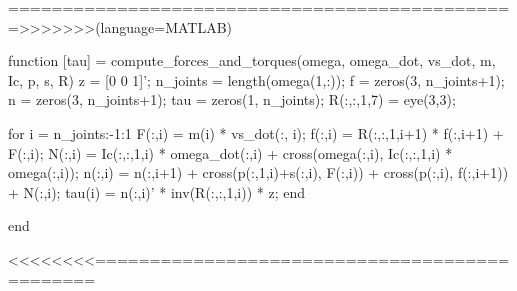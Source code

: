 ===============================================>>>>>>>(language=MATLAB)

function [tau] = compute_forces_and_torques(omega, omega_dot, vs_dot, m, Ic, p, s, R)
	z = [0 0 1]';
	n_joints = length(omega(1,:));
	f = zeros(3, n_joints+1);
	n = zeros(3, n_joints+1);
	tau = zeros(1, n_joints);
	R(:,:,1,7) = eye(3,3);

	for i = n_joints:-1:1
		F(:,i) = m(i) * vs_dot(:, i);
		f(:,i) = R(:,:,1,i+1) * f(:,i+1) + F(:,i);
		N(:,i) = Ic(:,:,1,i) * omega_dot(:,i) + cross(omega(:,i), Ic(:,:,1,i) * omega(:,i));
		n(:,i) = n(:,i+1) + cross(p(:,1,i)+s(:,i), F(:,i)) + cross(p(:,i), f(:,i+1)) + N(:,i);
		tau(i) = n(:,i)' * inv(R(:,:,1,i)) * z;
	end

end

<<<<<<<<==============================================




